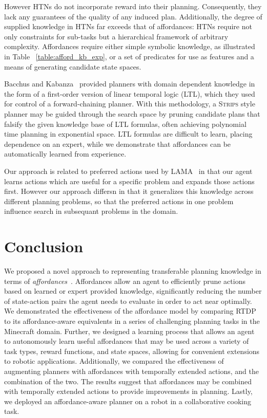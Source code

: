 \documentclass[letterpaper]{article}
\begin{document}
However HTNs do not incorporate reward into their
planning. Consequently, they lack any guarantees of the quality of any
induced plan.  Additionally, the degree of supplied knowledge in HTNs
far exceeds that of affordances: HTNs require not only constraints for
sub-tasks but a hierarchical framework of arbitrary
complexity. Affordances require either simple symbolic knowledge, as
illustrated in Table ~\ref{table:afford_kb_exp}, or a set of
predicates for use as features and a means of generating candidate
state spaces.


Bacchus and
Kabanza~\cite{Bacchus95usingtemporal,Bacchus99usingtemporal} provided
planners with domain dependent knowledge in the form of a first-order
version of linear temporal logic (LTL), which they used for control of
a forward-chaining planner. With this methodology, a \textsc{Strips}
style planner may be guided through the search space by pruning
candidate plans that falsify the given knowledge base of LTL formulas,
often achieving polynomial time planning in exponential space.  LTL
formulas are difficult to learn, placing dependence on an expert,
while we demonstrate that affordances can be automatically learned
from experience.

Our approach is related to preferred actions used by
LAMA~\citep{richter10} in that our agent learns actions which are
useful for a specific problem and expands those actions first.
However our approach differsn in that it generalizes this knowledge
across different planning problems, so that the preferred actions in
one problem influence search in subsequant problems in the domain.



\section{Conclusion}
\label{sec:conclusion}
We proposed a novel approach to representing transferable planning
knowledge in terms of {\em affordances}~\cite{gibson77}. Affordances
allow an agent to efficiently prune actions based on learned or expert
provided knowledge, significantly reducing the number of state-action
pairs the agent needs to evaluate in order to act near optimally. We
demonstrated the effectiveness of the affordance model by comparing
RTDP to its affordance-aware equivalents in a series of challenging
planning tasks in the Minecraft domain. Further, we designed a
learning process that allows an agent to autonomously learn useful
affordances that may be used across a variety of task types, reward
functions, and state spaces, allowing for convenient extensions to
robotic applications.  Additionally, we compared the effectiveness of
augmenting planners with affordances with temporally extended actions,
and the combination of the two. The results suggest that affordances
may be combined with temporally extended actions to provide
improvements in planning.  Lastly, we deployed an affordance-aware
planner on a robot in a collaborative cooking task.
\end{document}
